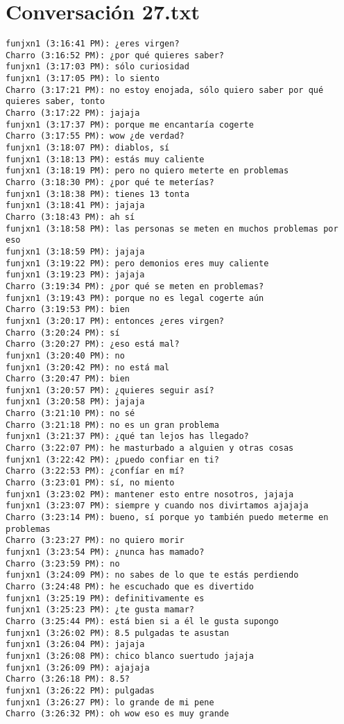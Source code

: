 \section{Conversaci\'on 27.txt}

\begin{verbatim}
funjxn1 (3:16:41 PM): ¿eres virgen?
Charro (3:16:52 PM): ¿por qué quieres saber?
funjxn1 (3:17:03 PM): sólo curiosidad
funjxn1 (3:17:05 PM): lo siento
Charro (3:17:21 PM): no estoy enojada, sólo quiero saber por qué quieres saber, tonto
Charro (3:17:22 PM): jajaja
funjxn1 (3:17:37 PM): porque me encantaría cogerte
Charro (3:17:55 PM): wow ¿de verdad?
funjxn1 (3:18:07 PM): diablos, sí
funjxn1 (3:18:13 PM): estás muy caliente
funjxn1 (3:18:19 PM): pero no quiero meterte en problemas
Charro (3:18:30 PM): ¿por qué te meterías?
funjxn1 (3:18:38 PM): tienes 13 tonta
funjxn1 (3:18:41 PM): jajaja
Charro (3:18:43 PM): ah sí
funjxn1 (3:18:58 PM): las personas se meten en muchos problemas por eso
funjxn1 (3:18:59 PM): jajaja
funjxn1 (3:19:22 PM): pero demonios eres muy caliente
funjxn1 (3:19:23 PM): jajaja
Charro (3:19:34 PM): ¿por qué se meten en problemas?
funjxn1 (3:19:43 PM): porque no es legal cogerte aún
Charro (3:19:53 PM): bien
funjxn1 (3:20:17 PM): entonces ¿eres virgen?
Charro (3:20:24 PM): sí
Charro (3:20:27 PM): ¿eso está mal?
funjxn1 (3:20:40 PM): no
funjxn1 (3:20:42 PM): no está mal
Charro (3:20:47 PM): bien
funjxn1 (3:20:57 PM): ¿quieres seguir así?
funjxn1 (3:20:58 PM): jajaja
Charro (3:21:10 PM): no sé 
Charro (3:21:18 PM): no es un gran problema
funjxn1 (3:21:37 PM): ¿qué tan lejos has llegado?
Charro (3:22:07 PM): he masturbado a alguien y otras cosas
funjxn1 (3:22:42 PM): ¿puedo confiar en ti?
Charro (3:22:53 PM): ¿confíar en mí?
Charro (3:23:01 PM): sí, no miento
funjxn1 (3:23:02 PM): mantener esto entre nosotros, jajaja
funjxn1 (3:23:07 PM): siempre y cuando nos divirtamos ajajaja
Charro (3:23:14 PM): bueno, sí porque yo también puedo meterme en problemas
Charro (3:23:27 PM): no quiero morir
funjxn1 (3:23:54 PM): ¿nunca has mamado?
Charro (3:23:59 PM): no
funjxn1 (3:24:09 PM): no sabes de lo que te estás perdiendo
Charro (3:24:48 PM): he escuchado que es divertido
funjxn1 (3:25:19 PM): definitivamente es
funjxn1 (3:25:23 PM): ¿te gusta mamar?
Charro (3:25:44 PM): está bien si a él le gusta supongo
funjxn1 (3:26:02 PM): 8.5 pulgadas te asustan
funjxn1 (3:26:04 PM): jajaja
funjxn1 (3:26:08 PM): chico blanco suertudo jajaja
funjxn1 (3:26:09 PM): ajajaja
Charro (3:26:18 PM): 8.5?
funjxn1 (3:26:22 PM): pulgadas
funjxn1 (3:26:27 PM): lo grande de mi pene
Charro (3:26:32 PM): oh wow eso es muy grande

\end{verbatim}
